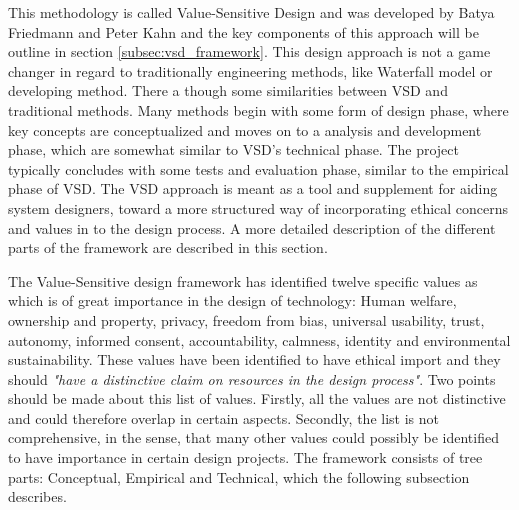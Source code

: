 This methodology is called Value-Sensitive Design and was developed by Batya Friedmann and Peter Kahn and the key components of this approach will be outline in section \ref{subsec:vsd_framework}.\newline
This design approach is not a game changer in regard to traditionally engineering methods, like Waterfall model or developing method. There a though some similarities between VSD and traditional methods. Many methods begin with some form of design phase, where key concepts are conceptualized and moves on to a analysis and development phase, which are somewhat similar to VSD's technical phase. The project typically concludes with some tests and evaluation phase, similar to the empirical phase of VSD\citep[p. 704]{IntegratingEthicsCummings}.\newline
The VSD approach is meant as a tool and supplement for aiding system designers, toward a more structured way of incorporating ethical concerns and values in to the design process.\newline 
A more detailed description of the different parts of the framework are described in this section.\newline

The Value-Sensitive design framework has identified twelve specific values as which is of great importance in the design of technology: Human welfare, ownership and property, privacy, freedom from bias, universal usability, trust, autonomy, informed consent, accountability, calmness, identity and environmental sustainability. These values have been identified to have ethical import and they should \textit{"have a distinctive claim on resources in the design process"}\citep[p. 1187]{HumanValuesEthicsAndDesign}. Two points should be made about this list of values. Firstly, all the values are not distinctive and could therefore overlap in certain aspects. Secondly, the list is not comprehensive, in the sense, that many other values could possibly be identified to have importance in certain design projects.\newline 
The framework consists of tree parts: Conceptual, Empirical and Technical, which the following subsection describes. 

